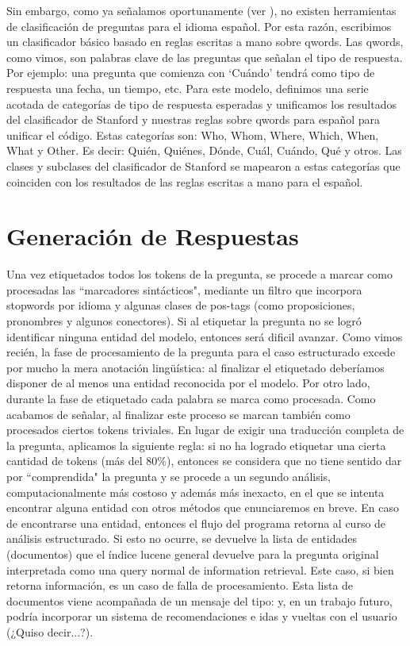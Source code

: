 Sin embargo, como ya señalamos oportunamente (ver ), no existen herramientas de clasificación de preguntas para el idioma español. Por esta razón, escribimos un clasificador básico basado en reglas escritas a mano sobre qwords. Las qwords, como vimos, son palabras clave de las preguntas que señalan el tipo de respuesta. Por ejemplo: una pregunta que comienza con `Cuándo' tendrá como tipo de respuesta una fecha, un tiempo, etc. Para este modelo, definimos una serie acotada de categorías de tipo de respuesta esperadas y unificamos los resultados del clasificador de Stanford y nuestras reglas sobre qwords para español para unificar el código. Estas categorías son:  Who, Whom, Where, Which,  When,  What y Other. Es decir: Quién, Quiénes, Dónde, Cuál, Cuándo, Qué y otros. Las clases y subclases del clasificador de Stanford se mapearon a estas categorías que coinciden con los resultados de las reglas escritas a mano para el español. 


\section{Generación de Respuestas}
\label{sec:ar-mitic}
\horrible

Una vez etiquetados todos los tokens de la pregunta, se procede a marcar como procesadas las ``marcadores sintácticos", mediante un filtro que incorpora stopwords por idioma y algunas clases de pos-tags (como proposiciones, pronombres y algunos conectores). Si al etiquetar la pregunta no se logró identificar ninguna entidad del modelo, entonces será dificil avanzar. Como vimos recién, la fase de procesamiento de la pregunta para el caso estructurado excede por mucho la mera anotación lingüística: al finalizar el etiquetado deberíamos disponer de al menos una entidad reconocida por el modelo. Por otro lado, durante la fase de etiquetado cada palabra se marca como procesada. Como acabamos de señalar, al finalizar este proceso se marcan también como procesados ciertos tokens triviales. En lugar de exigir una traducción completa de la pregunta, aplicamos la siguiente regla: si no ha logrado etiquetar una cierta cantidad de tokens (más del 80\%), entonces se considera que no tiene sentido dar por ``comprendida" la pregunta y se procede a un segundo análisis, computacionalmente más costoso y además más inexacto, en el que se intenta encontrar alguna entidad con otros métodos que enunciaremos en breve. En caso de encontrarse una entidad, entonces el flujo del programa retorna al curso de análisis estructurado. Si esto no ocurre, se devuelve la lista de entidades (documentos) que el índice lucene general devuelve para la pregunta original interpretada como una query normal de information retrieval. Este caso, si bien retorna información, es un caso de falla de procesamiento. Esta lista de documentos viene acompañada de un mensaje del tipo:  y, en un trabajo futuro, podría incorporar un sistema de recomendaciones e idas y vueltas con el usuario (¿Quiso decir...?).

